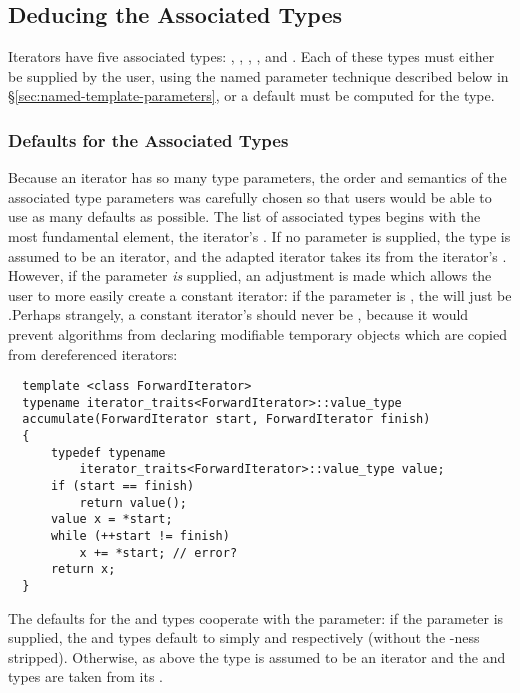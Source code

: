 \documentclass{netobjectdays}
\begin{document}
\subsection{Deducing the Associated Types}

Iterators have five associated types: ,
, , , and
. Each of these types must either be supplied
by the user, using the named parameter technique described below in
\S\ref{sec:named-template-parameters}, or a default must be computed
for the type.

\subsubsection{Defaults for the Associated Types}

Because an iterator has so many type parameters, the order and
semantics of the associated type parameters was carefully chosen so
that users would be able to use as many defaults as possible. The list
of associated types begins with the most fundamental element, the
iterator's . If no  parameter is supplied,
the  type is assumed to be an iterator, and the adapted
iterator takes its  from the 
iterator's . However, if the  parameter \emph{is} supplied,
an adjustment is made which allows the user to more easily create a
constant iterator: if the  parameter is ,
the  will just be .Perhaps
strangely, a constant iterator's  should never be
, because it would prevent algorithms from declaring
modifiable temporary objects which are copied from dereferenced
iterators:

{\footnotesize
\begin{verbatim}
  template <class ForwardIterator>
  typename iterator_traits<ForwardIterator>::value_type
  accumulate(ForwardIterator start, ForwardIterator finish)
  {
      typedef typename
          iterator_traits<ForwardIterator>::value_type value;
      if (start == finish)
          return value();
      value x = *start;
      while (++start != finish)
          x += *start; // error?
      return x;
  }
\end{verbatim}
}

The defaults for the  and  types
cooperate with the  parameter: if the 
parameter is supplied, the  and  types
default to simply  and  respectively
(without the -ness stripped). Otherwise, as above the
 type is assumed to be an iterator and the 
and  types are taken from its
.
\end{document}
